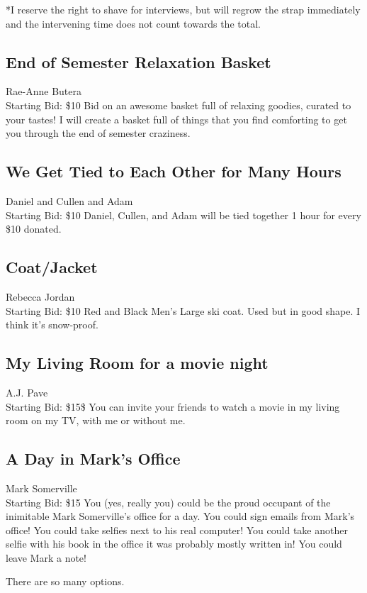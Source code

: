 \documentclass[11pt]{article}
\begin{document}
*I reserve the right to shave for interviews, but will regrow the strap immediately and the intervening time does not count towards the total.
\subsection{End of Semester Relaxation Basket}
Rae-Anne Butera
\\
Starting Bid: \$10
\newline
Bid on an awesome basket full of relaxing goodies, curated to your tastes! I will create a basket full of things that you find comforting to get you through the end of semester craziness.
\subsection{We Get Tied to Each Other for Many Hours}
Daniel and Cullen and Adam
\\
Starting Bid: \$10
\newline
Daniel, Cullen, and Adam will be tied together 1 hour for every \$10 donated.
\subsection{Coat/Jacket}
Rebecca Jordan
\\
Starting Bid: \$10
\newline
Red and Black Men's Large ski coat. Used but in good shape. I think it's snow-proof.
\subsection{My Living Room for a movie night}
A.J. Pave
\\
Starting Bid: \$15\$
\newline
You can invite your friends to watch a movie in my living room on my TV, with me or without me.
\subsection{A Day in Mark's Office}
Mark Somerville
\\
Starting Bid: \$15
\newline
You (yes, really you) could be the proud occupant of the inimitable Mark Somerville's office for a day. You could sign emails from Mark's office! You could take selfies next to his real computer! You could take another selfie with his book in the office it was probably mostly written in! You could leave Mark a note! 

There are so many options.
\end{document}
